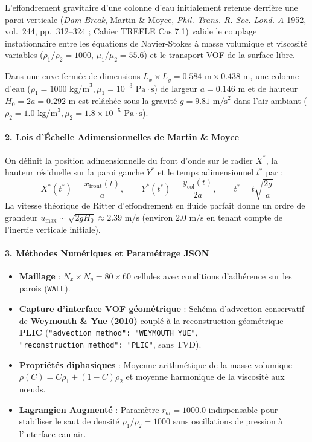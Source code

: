 \documentclass[
  10pt,
]{article}
\providecommand{\tightlist}{%
  \setlength{\itemsep}{0pt}\setlength{\parskip}{0pt}}
\begin{document}
L'effondrement gravitaire d'une colonne d'eau initialement retenue
derrière une paroi verticale (\emph{Dam Break}, Martin \& Moyce,
\emph{Phil. Trans. R. Soc. Lond. A} 1952, vol.~244, pp.~312--324 ;
Cahier TREFLE Cas 7.1) valide le couplage instationnaire entre les
équations de Navier-Stokes à masse volumique et viscosité variables
(\(\rho_1 / \rho_2 = 1000\), \(\mu_1 / \mu_2 = 55.6\)) et le transport
VOF de la surface libre.

Dans une cuve fermée de dimensions
\(L_x \times L_y = 0.584\text{ m} \times 0.438\text{ m}\), une colonne
d'eau
(\(\rho_1 = 1000\text{ kg/m}^3, \mu_1 = 10^{-3}\text{ Pa}\cdot\text{s}\))
de largeur \(a = 0.146\text{ m}\) et de hauteur
\(H_0 = 2a = 0.292\text{ m}\) est relâchée sous la gravité
\(g = 9.81\text{ m/s}^2\) dans l'air ambiant
(\(\rho_2 = 1.0\text{ kg/m}^3, \mu_2 = 1.8 \times 10^{-5}\text{ Pa}\cdot\text{s}\)).

\paragraph{2. Lois d'Échelle Adimensionnelles de Martin \&
Moyce}\label{lois-duxe9chelle-adimensionnelles-de-martin-moyce}

On définit la position adimensionnelle du front d'onde sur le radier
\(X^*\), la hauteur résiduelle sur la paroi gauche \(Y^*\) et le temps
adimensionnel \(t^*\) par :
\[X^*(t^*) = \frac{x_{\text{front}}(t)}{a}, \qquad Y^*(t^*) = \frac{y_{\text{col}}(t)}{2a}, \qquad t^* = t \sqrt{\frac{2g}{a}}\]
La vitesse théorique de Ritter d'effondrement en fluide parfait donne un
ordre de grandeur
\(u_{\max} \sim \sqrt{2 g H_0} \approx 2.39\text{ m/s}\) (environ
\(2.0\text{ m/s}\) en tenant compte de l'inertie verticale initiale).

\paragraph{3. Méthodes Numériques et Paramétrage
JSON}\label{muxe9thodes-numuxe9riques-et-paramuxe9trage-json-6}

\begin{itemize}
\tightlist
\item
  \textbf{Maillage} : \(N_x \times N_y = 80 \times 60\) cellules avec
  conditions d'adhérence sur les parois (\texttt{WALL}).
\item
  \textbf{Capture d'interface VOF géométrique} : Schéma d'advection
  conservatif de \textbf{Weymouth \& Yue (2010)} couplé à la
  reconstruction géométrique \textbf{PLIC}
  (\texttt{"advection\_method":\ "WEYMOUTH\_YUE"},
  \texttt{"reconstruction\_method":\ "PLIC"}, sans TVD).
\item
  \textbf{Propriétés diphasiques} : Moyenne arithmétique de la masse
  volumique \(\rho(C) = C \rho_1 + (1-C)\rho_2\) et moyenne harmonique
  de la viscosité aux nœuds.
\item
  \textbf{Lagrangien Augmenté} : Paramètre \(r_{al} = 1000.0\)
  indispensable pour stabiliser le saut de densité
  \(\rho_1 / \rho_2 = 1000\) sans oscillations de pression à l'interface
  eau-air.
\end{itemize}
\end{document}
